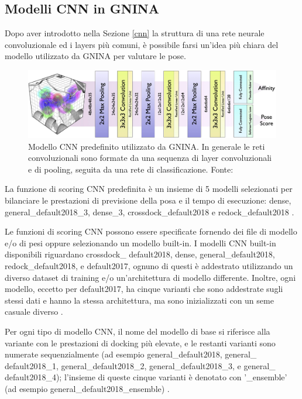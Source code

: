 \subsection{Modelli CNN in GNINA}
Dopo aver introdotto nella Sezione \ref{cnn} la struttura di una rete neurale convoluzionale ed i layers più comuni, è possibile farsi un'idea più chiara del modello utilizzato da GNINA per valutare le pose. 

\begin{figure}[H]
    \centering
    \includegraphics[scale=0.09]{images/chapter2/cnn_model.jpg}
    \caption[Modello CNN predefinito utilizzato da GNINA.]{Modello CNN predefinito utilizzato da GNINA. In generale le reti convoluzionali sono formate da una sequenza di layer convoluzionali e di pooling, seguita da una rete di classificazione. Fonte: \cite{mcnutt_gnina_2021}}
    \label{fig:cnn_model}
\end{figure}

La funzione di scoring CNN predefinita è un insieme di 5 modelli selezionati per bilanciare le prestazioni di previsione della posa e il tempo di esecuzione: dense, general\_default2018\_3, dense\_3, crossdock\_default2018 e redock\_default2018 \cite{mcnutt_gnina_2021}.


Le funzioni di scoring CNN possono essere specificate fornendo dei file di modello e/o di pesi oppure selezionando un modello built-in. 
I modelli CNN built-in disponibili riguardano crossdock\_ default2018, dense, general\_default2018, redock\_default2018, e default2017, ognuno di questi è addestrato utilizzando un diverso dataset di training e/o un'architettura di modello differente. Inoltre, ogni modello, eccetto per default2017, ha cinque varianti che sono addestrate sugli stessi dati e hanno la stessa architettura, ma sono inizializzati con un seme casuale diverso \cite{mcnutt_gnina_2021}. 


Per ogni tipo di modello CNN, il nome del modello di base si riferisce alla variante con le prestazioni di docking più elevate, e le restanti varianti sono numerate sequenzialmente (ad esempio general\_default2018, general\_ default2018\_1, general\_default2018\_2, general\_default2018\_3, e general\_ default2018\_4); l'insieme di queste cinque varianti è denotato con '\_ensemble' (ad esempio general\_default2018\_ensemble) \cite{mcnutt_gnina_2021}. 

